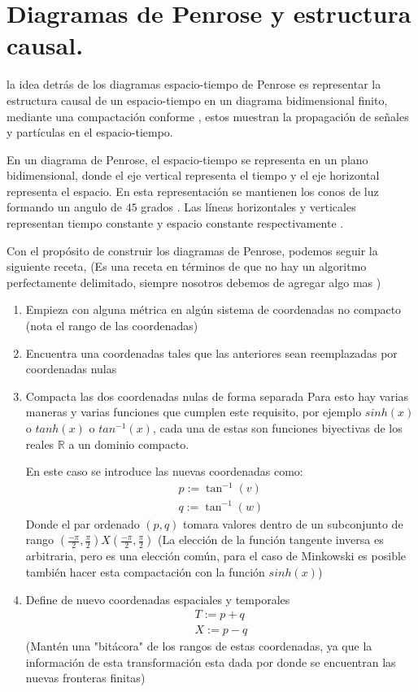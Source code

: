 \section{Diagramas de Penrose y estructura causal.}
la idea detrás de los diagramas espacio-tiempo  de Penrose es representar la estructura causal de un espacio-tiempo en un diagrama bidimensional finito, mediante una compactación conforme , estos muestran la propagación de señales y partículas en el espacio-tiempo.

En un diagrama de Penrose, el espacio-tiempo se representa en un plano bidimensional, donde el eje vertical representa el tiempo y el eje horizontal representa el espacio. En esta representación se mantienen los conos de luz formando un angulo de $45$ grados . Las líneas horizontales y verticales representan  tiempo constante y espacio constante respectivamente .


Con el propósito de construir los diagramas de Penrose, podemos seguir la siguiente receta,
(Es una receta en términos de que no hay un algoritmo perfectamente delimitado, siempre nosotros debemos de agregar algo mas )


\begin{enumerate}
  \item Empieza con alguna métrica en algún sistema de coordenadas no compacto (nota el rango de las coordenadas)
  \item Encuentra una coordenadas tales que las anteriores sean reemplazadas por coordenadas nulas
  \item Compacta las dos coordenadas nulas de forma separada
        Para esto hay varias maneras y varias funciones que cumplen este requisito, por ejemplo $sinh(x)$ o $tanh(x)$ o $tan^{-1}(x)$, cada una de estas son funciones biyectivas de los reales $\mathbb{R} $ a un dominio compacto.


        En este caso se introduce las nuevas coordenadas como:
        \begin{equation}
          \begin{array}{l}
            p:=\tan ^{-1}(v) \\
            q:=\tan ^{-1}(w)
          \end{array}
        \end{equation}
        Donde el par ordenado $(p,q)$ tomara valores dentro de un subconjunto de rango
        $(\frac{-\pi}{2},\frac{\pi}{2})X(\frac{-\pi}{2},\frac{\pi}{2})$
        (La elección  de la función tangente inversa es arbitraria, pero es una elección común, para el caso de Minkowski es posible también hacer  esta compactación con la función $sinh(x)$)
  \item Define de nuevo coordenadas espaciales y temporales
        \begin{equation}
          \begin{array}{l}
            T:=p+q \\
            X:=p-q
          \end{array}
        \end{equation}
        (Mantén una "bitácora" de los rangos de estas coordenadas, ya que la información de esta transformación esta dada por donde se encuentran las nuevas fronteras finitas)
\end{enumerate}
